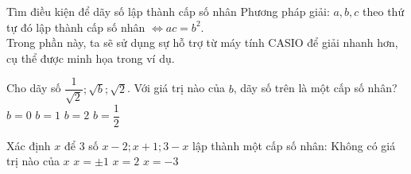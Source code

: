\begin{dang}{Tìm điều kiện để dãy số lập thành cấp số nhân}
	Phương pháp giải: $a, b, c$ theo thứ tự đó lập thành cấp số nhân $\Leftrightarrow ac=b^2.$\\
	Trong phần này, ta sẽ sử dụng sự hỗ trợ từ máy tính CASIO để giải nhanh hơn, cụ thể được minh họa trong ví dụ.
\end{dang}
\begin{vd}%
	Cho dãy số $\dfrac{1}{\sqrt{2}};\sqrt{b}; \sqrt{2}$. Với giá trị nào của $b$, dãy số trên là một cấp số nhân?
	\choice
	{$b=0$}
	{\True $b=1$}
	{$b=2$}
	{$b=\dfrac{1}{2}$}
\end{vd}
\begin{vd}%
	Xác định $x$ để $3$ số $x-2; x+1; 3-x$ lập thành một cấp số nhân:
	\choice
	{\True Không có giá trị nào của $x$}
	{$x=\pm 1$}
	{$x= 2$}
	{$x=-3$}
\end{vd}
